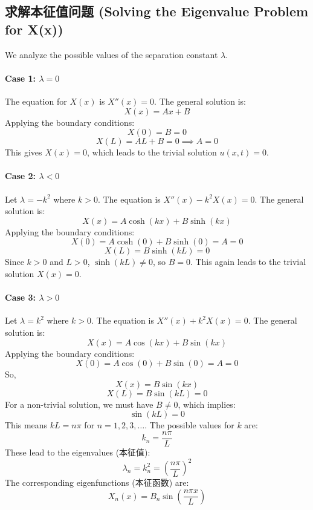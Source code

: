 \documentclass{article}
\begin{document}
	\subsection*{求解本征值问题 (Solving the Eigenvalue Problem for X(x))}
	We analyze the possible values of the separation constant $\lambda$.
	
	\paragraph{Case 1: $\lambda = 0$}
	The equation for $X(x)$ is $X''(x) = 0$.
	The general solution is:
	$$ X(x) = Ax + B $$
	Applying the boundary conditions:
	$$ X(0) = B = 0 $$
	$$ X(L) = AL + B = 0 \implies A = 0 $$
	This gives $X(x) = 0$, which leads to the trivial solution $u(x,t) = 0$.
	
	\paragraph{Case 2: $\lambda < 0$}
	Let $\lambda = -k^2$ where $k > 0$. The equation is $X''(x) - k^2 X(x) = 0$.
	The general solution is:
	$$ X(x) = A \cosh(kx) + B \sinh(kx) $$
	Applying the boundary conditions:
	$$ X(0) = A \cosh(0) + B \sinh(0) = A = 0 $$
	$$ X(L) = B \sinh(kL) = 0 $$
	Since $k>0$ and $L>0$, $\sinh(kL) \neq 0$, so $B=0$.
	This again leads to the trivial solution $X(x) = 0$.
	
	\paragraph{Case 3: $\lambda > 0$}
	Let $\lambda = k^2$ where $k > 0$. The equation is $X''(x) + k^2 X(x) = 0$.
	The general solution is:
	$$ X(x) = A \cos(kx) + B \sin(kx) $$
	Applying the boundary conditions:
	$$ X(0) = A \cos(0) + B \sin(0) = A = 0 $$
	So,
	$$ X(x) = B \sin(kx) $$
	$$ X(L) = B \sin(kL) = 0 $$
	For a non-trivial solution, we must have $B \neq 0$, which implies:
	$$ \sin(kL) = 0 $$
	This means $kL = n\pi$ for $n = 1, 2, 3, \dots$.
	The possible values for $k$ are:
	$$ k_n = \frac{n\pi}{L} $$
	These lead to the eigenvalues (本征值):
	$$ \lambda_n = k_n^2 = \left(\frac{n\pi}{L}\right)^2 $$
	The corresponding eigenfunctions (本征函数) are:
	$$ X_n(x) = B_n \sin\left(\frac{n\pi x}{L}\right) $$
	
\end{document}
